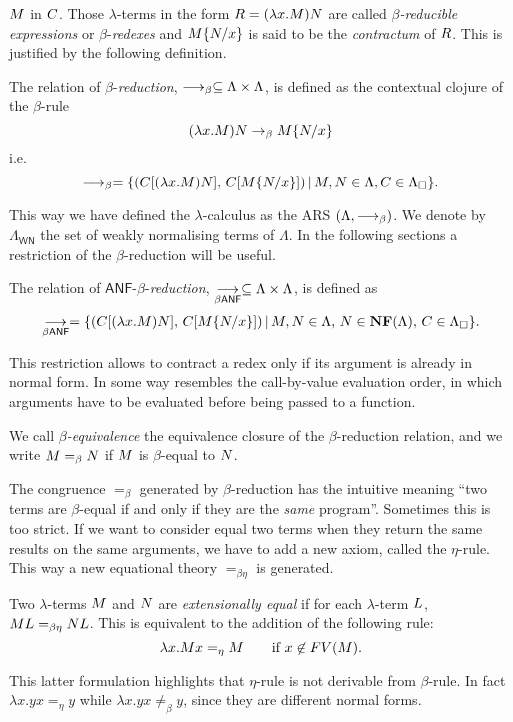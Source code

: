$M$ in $C$. Those $\lambda$-terms in the form
$R=(\lambda x.M)N$ are called \emph{$\beta$-reducible expressions} or
$\beta$-\emph{redexes} and $M\{N/x\}$ is said to be
the \emph{contractum} of $R$. This is justified by the following definition.
\begin{definition}
	The relation of $\beta$-\emph{reduction}, $\longrightarrow_\beta\subseteq\Lambda\times\Lambda$, is defined as the contextual clojure of the $\beta$-rule
	$$
	(\lambda x.M)N\rightarrow_\beta M\{N/x\}
	$$
	i.e.
	$$
	\longrightarrow_\beta = \{(C[(\lambda x.M)N],\, C[M\{N/x\}])\, |\, M, N\in\Lambda, C\in\Lambda_\Box\}.
	$$
\end{definition}
This way we have defined the $\lambda$-calculus as the ARS $(\Lambda,\longrightarrow_\beta)$. We denote by $\Lambda_\mathsf{WN}$ the set of weakly normalising terms of $\Lambda$. In the following sections a restriction of the $\beta$-reduction will be useful.
\begin{definition}
	The relation of $\mathsf{ANF}$-$\beta$-\emph{reduction}, $\underset{\beta\textsf{ANF}}{\longrightarrow}\subseteq\Lambda\times\Lambda$, is defined as
	$$
	\underset{\beta\textsf{ANF}}{\longrightarrow} = \{(C[(\lambda x.M)N],\, C[M\{N/x\}])\, |\, M, N\in\Lambda,\,N\in\textbf{NF}(\Lambda),\, C\in\Lambda_\Box\}.
	$$
\end{definition}
This restriction allows to contract a redex only if its argument is already in normal form. In some way resembles the call-by-value evaluation order, in which arguments have to be evaluated before being passed to a function.
\begin{definition}
	We call \emph{$\beta$-equivalence} the equivalence closure of the $\beta$-reduction relation, and we write $M=_\beta N$ if $M$ is $\beta$-equal to $N$.
\end{definition}
The congruence $=_\beta$ generated by $\beta$-reduction has the intuitive meaning ``two terms are $\beta$-equal if and only if they are the \emph{same} program''. Sometimes this is too strict. If we want to consider equal two terms when they return the same results on the same arguments, we have to add a new axiom, called the $\eta$-rule. This way a new equational theory $=_{\beta\eta}$ is generated.
\begin{definition}
	Two $\lambda$-terms $M$ and $N$ are \emph{extensionally equal} if for each $\lambda$-term $L$, $ML=_{\beta\eta}NL$. This is equivalent to the addition of the following rule:
	$$
	\lambda x.M x=_\eta M \qquad\textrm{if }x\not\in FV(M).
	$$
\end{definition}
This latter formulation highlights that $\eta$-rule is not derivable from $\beta$-rule. In fact $\lambda x.yx=_\eta y$ while $\lambda x.yx\not=_\beta y$, since they are different normal forms.
